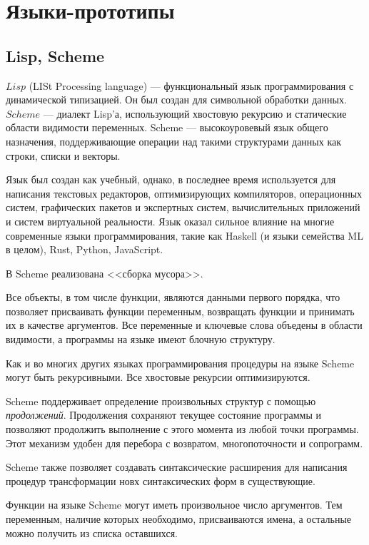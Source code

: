 \section{Языки-прототипы}
    \subsection{Lisp, Scheme}
        $Lisp$ (LISt Processing language) --- функциональный язык программирования с динамической типизацией. 
        Он был создан для символьной обработки данных\cite{p_c_lisp}.
        $Scheme$ --- диалект Lisp'а, использующий хвостовую рекурсию и статические области видимости переменных\cite{scheme_doc}.
        Scheme --- высокоуровевый язык общего назначения, поддерживающие операции над такими структурами данных как строки, списки и векторы.

        Язык был создан как учебный, однако, в последнее время используется для написания текстовых редакторов, оптимизирующих компиляторов, операционных систем, графических пакетов и экспертных систем, вычислительных приложений и систем виртуальной реальности.
        Язык оказал сильное влияние на многие современные языки программирования, такие как Haskell (и языки семейства ML в целом), Rust, Python, JavaScript.

        В Scheme реализована <<сборка мусора>>.
        
        Все объекты, в том числе функции, являются данными первого порядка, что позволяет присваивать функции переменным, возвращать функции и принимать их в качестве аргументов.
        Все переменные и ключевые слова объедены в области видимости, а программы на языке имеют блочную структуру.
        
        Как и во многих других языках программирования процедуры на языке Scheme могут быть рекурсивными.
        Все хвостовые рекурсии оптимизируются.

        Scheme поддерживает определение произвольных структур с помощью \textit{продолжений}.
        Продолжения сохраняют текущее состояние программы и позволяют продолжить выполнение с этого момента из любой точки программы.
        Этот механизм удобен для перебора с возвратом, многопоточности и сопрограмм.

        Scheme также позволяет создавать синтаксические расширения для написания процедур трансформации новх синтаксических форм в существующие\cite{scheme_pl}.

        Функции на языке Scheme могут иметь произвольное число аргументов.
        Тем переменным, наличие которых необходимо, присваиваются имена, а остальные можно получить из списка оставшихся.

